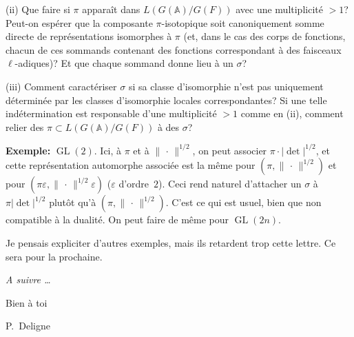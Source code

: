 \documentclass[11pt,a4paper]{article}
\theoremstyle{plain}
\theoremstyle{definition}
\DeclareMathOperator{\GL}{GL}
\newcommand{\norm}[1]{\lVert#1\rVert}
\begin{document}
(ii) Que faire si $\pi$ appara\^{i}t dans $L(G(\mathbb A)/G(F))$ avec une multiplicit\'{e} $> 1$? Peut-on esp\'{e}rer que la composante $\pi$-isotopique soit canoniquement somme directe de repr\'{e}sentations isomorphes \`{a} $\pi$ (et, dans le cas des corps de fonctions, chacun de ces sommands contenant des fonctions correspondant \`{a} des faisceaux $\ell$-adiques)? Et que chaque sommand donne lieu \`{a} un $\sigma$?

(iii) Comment caract\'{e}riser $\sigma$ si sa classe d'isomorphie n'est pas uniquement d\'{e}termin\'{e}e par les classes d'isomorphie locales correspondantes? Si une telle ind\'{e}termination est responsable d'une multiplicit\'{e} $> 1$ comme en (ii), comment relier des $\pi \subset L(G(\mathbb A)/G(F))$ \`{a} des $\sigma$?

\bigskip
\textbf{Exemple:} $\GL(2)$. Ici, \`{a} $\pi$ et \`{a} $\norm{\,\cdot\,}^{1/2}$, on peut associer $\pi \cdot |\det|^{1/2}$, et cette repr\'{e}sentation automorphe associ\'{e}e est la m\^{e}me pour $(\pi, \norm{\,\cdot\,}^{1/2})$ et pour $(\pi\varepsilon, \norm{\,\cdot\,}^{1/2}\varepsilon)$ ($\varepsilon$ d'ordre~$2$). Ceci rend naturel d'attacher un $\sigma$ \`{a} $\pi|\det|^{1/2}$ plut\^{o}t qu'\`{a} $(\pi, \norm{\,\cdot\,}^{1/2})$. C'est ce qui est usuel, bien que non compatible \`{a} la dualit\'{e}. On peut faire de m\^{e}me pour $\GL(2n)$.

Je pensais expliciter d'autres exemples, mais ils retardent trop cette lettre. Ce sera pour la prochaine.

\begin{center}
\textit{A suivre \ldots}

\medskip
Bien \`{a} toi

\medskip
P.~Deligne
\end{center}
\end{document}
